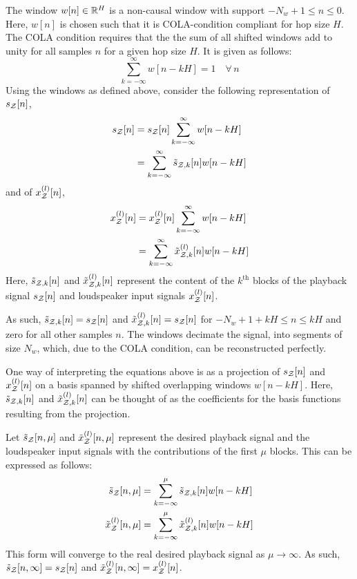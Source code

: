 The window $w[n]\in\mathbb{R}^{H}$ is a non-causal window with support $-N_w + 1 \leq n \leq 0$. 
Here, $w[n]$ is chosen such that it is COLA-condition compliant for hop size $H$.
The COLA condition requires that the the sum of all shifted windows add to unity for all samples $n$ for a given hop size $H$. 
It is given as follows:
\begin{equation}
     \sum_{k=-\infty}^{\infty} w[n - kH] = 1 \quad\forall\,n
\end{equation}
Using the windows as defined above, consider the following representation of $s_{\mathcal{Z}}[n]$,
\begin{equation}
    \begin{aligned}
        s_{\mathcal{Z}}[n] &= s_{\mathcal{Z}}[n]\sum_{k=-\infty}^{\infty} w[n - kH] \\
                 &= \sum_{k=-\infty}^{\infty} \tilde{s}_{\mathcal{Z},k}[n]w[n - kH]
    \end{aligned}
\end{equation}
and of $x^{(l)}_{\mathcal{Z}}[n]$,
\begin{equation}
    \begin{aligned}
        x^{(l)}_{\mathcal{Z}}[n] &= x^{(l)}_{\mathcal{Z}}[n]\sum_{k=-\infty}^{\infty} w[n - kH] \\
                       &= \sum_{k=-\infty}^{\infty} \tilde{x}^{(l)}_{\mathcal{Z},k}[n]w[n - kH]
    \end{aligned}
\end{equation}
Here, $\tilde{s}_{\mathcal{Z},k}[n]$ and $\tilde{x}^{(l)}_{\mathcal{Z},k}[n]$ represent the content of the $k^\text{th}$ blocks of the playback signal $s_{\mathcal{Z}}[n]$ and loudspeaker input signals $x^{(l)}_{\mathcal{Z}}[n]$.

As such, $\tilde{s}_{\mathcal{Z},k}[n] = s_{\mathcal{Z}}[n]$ and $\tilde{x}^{(l)}_{\mathcal{Z},k}[n] = s_{\mathcal{Z}}[n]$ for $-N_w + 1 + kH \leq n \leq kH$ and zero for all other samples $n$.  
The windows decimate the signal, into segments of size $N_w$, which, due to the COLA condition, can be reconstructed perfectly.

One way of interpreting the equations above is as a projection of $s_{\mathcal{Z}}[n]$ and $x^{(l)}_{\mathcal{Z}}[n]$ on a 
basis spanned by shifted overlapping windows $w[n - kH]$.
Here, $\tilde{s}_{\mathcal{Z},k}[n]$ and $\tilde{x}^{(l)}_{\mathcal{Z},k}[n]$ can be thought of as the coefficients for the basis functions resulting from the projection.

Let $\tilde{s}_{\mathcal{Z}}[n, \mu]$ and $\tilde{x}^{(l)}_{\mathcal{Z}}[n, \mu]$ represent the desired playback signal and the loudspeaker input signals with the contributions of the first $\mu$ blocks. 
This can be expressed as follows:
\begin{align}
    \tilde{s}_{\mathcal{Z}}[n, \mu] &= \sum_{k=-\infty}^{\mu} \tilde{s}_{\mathcal{Z},k}[n]w[n - kH] \\
    \tilde{x}^{(l)}_{\mathcal{Z}}[n, \mu] &= \sum_{k=-\infty}^{\mu} \tilde{x}^{(l)}_{\mathcal{Z},k}[n]w[n - kH]
\end{align}
This form will converge to the real desired playback signal as $\mu\to\infty$.
As such, $\tilde{s}_{\mathcal{Z}}[n, \infty] = s_{\mathcal{Z}}[n]$ and $\tilde{x}^{(l)}_{\mathcal{Z}}[n, \infty] = x^{(l)}_{\mathcal{Z}}[n]$.

